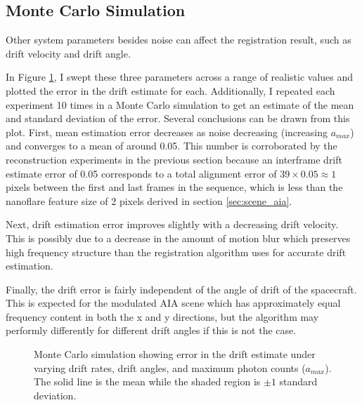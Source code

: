 \documentclass[tocnosub,noragright,centerchapter,12pt]{uiucecethesis09}
\begin{document}
\subsection{Monte Carlo Simulation}

Other system parameters besides noise can affect the registration result, such as drift velocity and drift angle.

In Figure \ref{fig:monte}, I swept these three parameters across a range of realistic values and plotted the error in the drift estimate for each.  Additionally, I repeated each experiment 10 times in a Monte Carlo simulation to get an estimate of the mean and standard deviation of the error.  Several conclusions can be drawn from this plot.  First, mean estimation error decreases as noise decreasing (increasing $a_{max}$) and converges to a mean of around 0.05.  This number is corroborated by the reconstruction experiments in the previous section because an interframe drift estimate error of 0.05 corresponds to a total alignment error of $39 \times 0.05 \approx 1$ pixels between the first and last frames in the sequence, which is less than the nanoflare feature size of 2 pixels derived in section \ref{sec:scene_aia}.

Next, drift estimation error improves slightly with a decreasing drift velocity.  This is possibly due to a decrease in the amount of motion blur which preserves high frequency structure than the registration algorithm uses for accurate drift estimation.

Finally, the drift error is fairly independent of the angle of drift of the spacecraft.  This is expected for the modulated AIA scene which has approximately equal frequency content in both the x and y directions, but the algorithm may performly differently for different drift angles if this is not the case.

\begin{figure}
  \centering
  \caption{Monte Carlo simulation showing error in the drift estimate under varying drift rates, drift angles, and maximum photon counts ($a_{max}$). The solid line is the mean while the shaded region is $\pm 1$ standard deviation.}
  \label{fig:monte}
\end{figure}
\end{document}
